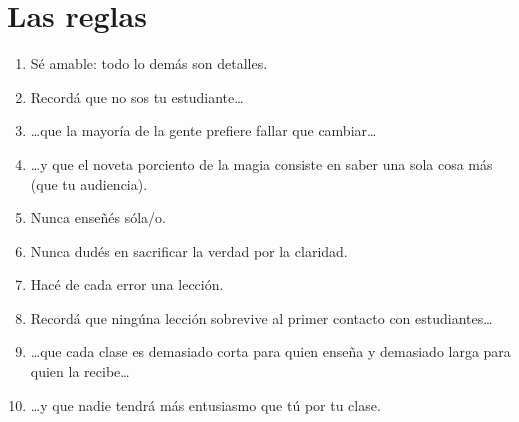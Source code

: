 \chapter*{Las reglas}

\begin{enumerate}

\item S\'e amable: todo lo dem\'as son detalles.\\

\item Record\'a que no sos tu estudiante{\ldots}\\

\item {\ldots}que la mayor\'ia de la gente prefiere fallar que cambiar{\ldots}\\

\item {\ldots}y que el noveta porciento de la magia consiste en saber una sola cosa m\'as (que tu audiencia).\\

\item Nunca ense\~n\'es s\'ola/o.\\

\item Nunca dud\'es en sacrificar la verdad por la claridad.\\

\item Hac\'e de cada error una lecci\'on.\\

\item Record\'a que ning\'una lecci\'on sobrevive al primer contacto con estudiantes{\ldots}\\

\item {\ldots}que cada clase es demasiado corta para quien ense\~na y demasiado larga para quien la recibe{\ldots}\\

\item {\ldots}y que nadie tendr\'a m\'as entusiasmo que t\'u por tu clase.

\end{enumerate}
